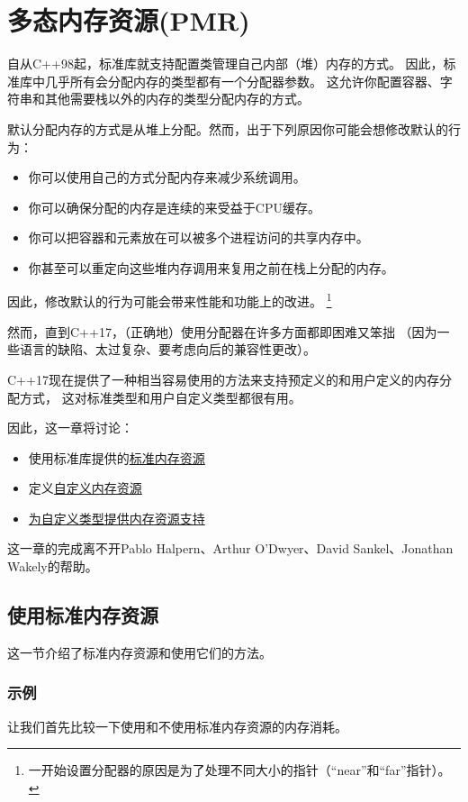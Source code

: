 \chapter{多态内存资源(PMR)}\label{ch29}
自从C++98起，标准库就支持配置类管理自己内部（堆）内存的方式。
因此，标准库中几乎所有会分配内存的类型都有一个分配器参数。
这允许你配置容器、字符串和其他需要栈以外的内存的类型分配内存的方式。

默认分配内存的方式是从堆上分配。然而，出于下列原因你可能会想修改默认的行为：
\begin{itemize}
    \item 你可以使用自己的方式分配内存来减少系统调用。
    \item 你可以确保分配的内存是连续的来受益于CPU缓存。
    \item 你可以把容器和元素放在可以被多个进程访问的共享内存中。
    \item 你甚至可以重定向这些堆内存调用来复用之前在栈上分配的内存。
\end{itemize}
因此，修改默认的行为可能会带来性能和功能上的改进。
\footnote{一开始设置分配器的原因是为了处理不同大小的指针（“near”和“far”指针）。}

然而，直到C++17，（正确地）使用分配器在许多方面都即困难又笨拙
（因为一些语言的缺陷、太过复杂、要考虑向后的兼容性更改）。

C++17现在提供了一种相当容易使用的方法来支持预定义的和用户定义的内存分配方式，
这对标准类型和用户自定义类型都很有用。

因此，这一章将讨论：
\begin{itemize}
    \item 使用标准库提供的\hyperref[ch29.1]{标准内存资源}
    \item 定义\hyperref[ch29.2]{自定义内存资源}
    \item \hyperref[ch29.3]{为自定义类型提供内存资源支持}
\end{itemize}

这一章的完成离不开Pablo Halpern、Arthur O'Dwyer、David Sankel、Jonathan Wakely的帮助。


\section{使用标准内存资源}\label{ch29.1}
这一节介绍了标准内存资源和使用它们的方法。

\subsection{示例}
让我们首先比较一下使用和不使用标准内存资源的内存消耗。

